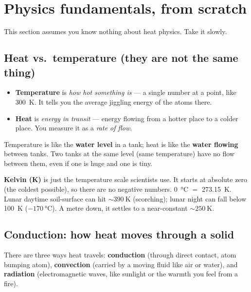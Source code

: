 \section{Physics fundamentals, from scratch}
\label{sec:physics}

This section assumes you know nothing about heat physics. Take it slowly.

\subsection{Heat vs.\ temperature (they are not the same thing)}

\begin{itemize}[leftmargin=1.4em,itemsep=3pt]
  \item \textbf{Temperature} is \emph{how hot something is} --- a single number
    at a point, like \SI{300}{\kelvin}. It tells you the average jiggling energy
    of the atoms there.
  \item \textbf{Heat} is \emph{energy in transit} --- energy flowing from a
    hotter place to a colder place. You measure it as a \emph{rate of flow}.
\end{itemize}

\begin{analogy}
Temperature is like the \textbf{water level} in a tank; heat is like the
\textbf{water flowing} between tanks. Two tanks at the same level (same
temperature) have no flow between them, even if one is huge and one is tiny.
\end{analogy}

\textbf{Kelvin (K)} is just the temperature scale scientists use. It starts at
absolute zero (the coldest possible), so there are no negative numbers.
\SI{0}{\celsius} $=$ \SI{273.15}{\kelvin}. Lunar daytime soil-surface can hit
${\sim}\SI{390}{\kelvin}$ (scorching); lunar night can fall below
\SI{100}{\kelvin} ($-\SI{170}{\celsius}$). A metre down, it settles to a
near-constant ${\sim}\SI{250}{\kelvin}$.

\subsection{Conduction: how heat moves through a solid}

There are three ways heat travels: \textbf{conduction} (through direct contact,
atom bumping atom), \textbf{convection} (carried by a moving fluid like air or
water), and \textbf{radiation} (electromagnetic waves, like sunlight or the
warmth you feel from a fire).

